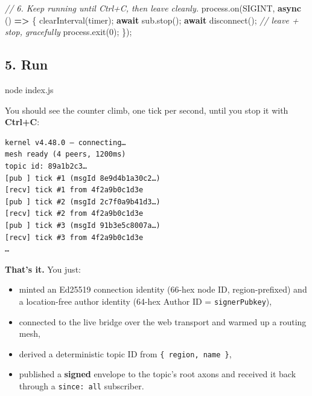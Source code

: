 \documentclass[
  nobib]{tufte-handout}
\newenvironment{Shaded}{}{}
\newcommand{\BuiltInTok}[1]{\textcolor[rgb]{0.00,0.50,0.00}{#1}}
\newcommand{\CommentTok}[1]{\textcolor[rgb]{0.38,0.63,0.69}{\textit{#1}}}
\newcommand{\ControlFlowTok}[1]{\textcolor[rgb]{0.00,0.44,0.13}{\textbf{#1}}}
\newcommand{\DecValTok}[1]{\textcolor[rgb]{0.25,0.63,0.44}{#1}}
\newcommand{\ExtensionTok}[1]{#1}
\newcommand{\FunctionTok}[1]{\textcolor[rgb]{0.02,0.16,0.49}{#1}}
\newcommand{\KeywordTok}[1]{\textcolor[rgb]{0.00,0.44,0.13}{\textbf{#1}}}
\newcommand{\NormalTok}[1]{#1}
\newcommand{\OperatorTok}[1]{\textcolor[rgb]{0.40,0.40,0.40}{#1}}
\newcommand{\PreprocessorTok}[1]{\textcolor[rgb]{0.74,0.48,0.00}{#1}}
\newcommand{\StringTok}[1]{\textcolor[rgb]{0.25,0.44,0.63}{#1}}
\providecommand{\tightlist}{%
  \setlength{\itemsep}{0pt}\setlength{\parskip}{0pt}}
\begin{document}
\begin{Shaded}
\begin{Highlighting}[]
\CommentTok{// 6. Keep running until Ctrl+C, then leave cleanly.}
\BuiltInTok{process}\OperatorTok{.}\FunctionTok{on}\NormalTok{(}\StringTok{\textquotesingle{}SIGINT\textquotesingle{}}\OperatorTok{,} \KeywordTok{async}\NormalTok{ () }\KeywordTok{=\textgreater{}}\NormalTok{ \{}
  \PreprocessorTok{clearInterval}\NormalTok{(timer)}\OperatorTok{;}
  \ControlFlowTok{await}\NormalTok{ sub}\OperatorTok{.}\FunctionTok{stop}\NormalTok{()}\OperatorTok{;}
  \ControlFlowTok{await} \FunctionTok{disconnect}\NormalTok{()}\OperatorTok{;}          \CommentTok{// leave + stop, gracefully}
  \BuiltInTok{process}\OperatorTok{.}\FunctionTok{exit}\NormalTok{(}\DecValTok{0}\NormalTok{)}\OperatorTok{;}
\NormalTok{\})}\OperatorTok{;}
\end{Highlighting}
\end{Shaded}

\subsection{5. Run}\label{run}

\begin{Shaded}
\begin{Highlighting}[]
\ExtensionTok{node}\NormalTok{ index.js}
\end{Highlighting}
\end{Shaded}

You should see the counter climb, one tick per second, until you stop it
with \textbf{Ctrl+C}:

\begin{verbatim}
kernel v4.48.0 — connecting…
mesh ready (4 peers, 1200ms)
topic id: 89a1b2c3…
[pub ] tick #1 (msgId 8e9d4b1a30c2…)
[recv] tick #1 from 4f2a9b0c1d3e
[pub ] tick #2 (msgId 2c7f0a9b41d3…)
[recv] tick #2 from 4f2a9b0c1d3e
[pub ] tick #3 (msgId 91b3e5c8007a…)
[recv] tick #3 from 4f2a9b0c1d3e
…
\end{verbatim}

\textbf{That's it.} You just:

\begin{itemize}
\tightlist
\item
  minted an Ed25519 connection identity (66-hex node ID,
  region-prefixed) and a location-free author identity (64-hex Author ID
  = \texttt{signerPubkey}),
\item
  connected to the live bridge over the web transport and warmed up a
  routing mesh,
\item
  derived a deterministic topic ID from \texttt{\{\ region,\ name\ \}},
\item
  published a \textbf{signed} envelope to the topic's root axons and
  received it back through a
  \texttt{since:\ \textquotesingle{}all\textquotesingle{}} subscriber.
\end{itemize}
\end{document}
